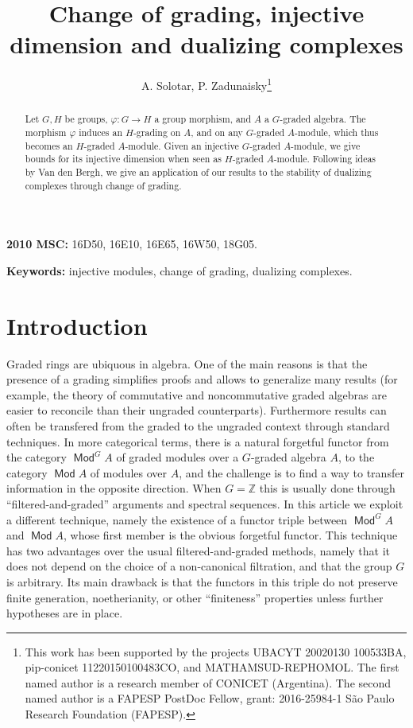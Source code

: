 \documentclass[11pt,fleqn]{article}
\title{
Change of grading, injective dimension and dualizing complexes
}
\author{A. Solotar,
P. Zadunaisky\footnote{This work has been supported by the projects 
UBACYT 20020130 100533BA, pip-conicet 11220150100483CO, and 
MATHAMSUD-REPHOMOL. The first named author is a research member of CONICET 
(Argentina). The second named author is a FAPESP PostDoc Fellow, grant: 
2016-25984-1 S\~ao Paulo Research Foundation (FAPESP).}
}
\date{}
\newcommand\ZZ{\mathbb Z}
\renewcommand\to{\longrightarrow}
\renewcommand\phi{\varphi}
\DeclareMathOperator\Mod{\mathsf{Mod}}
\begin{document}
\maketitle
  
\begin{abstract}
Let $G,H$ be groups, $\phi: G \to H$ a group morphism, and $A$ a $G$-graded 
algebra. The morphism $\phi$ induces an $H$-grading on $A$, and on any 
$G$-graded $A$-module, which thus becomes an $H$-graded $A$-module.
Given an injective $G$-graded $A$-module, we give bounds for its injective
dimension when seen as $H$-graded $A$-module. Following ideas by Van den
Bergh, we give an application of our results to the stability of dualizing
complexes through change of grading.
\end{abstract}

\textbf{2010 MSC:} 16D50, 16E10, 16E65, 16W50, 18G05.

\textbf{Keywords:} injective modules, change of grading, dualizing complexes.

\section{Introduction}
Graded rings are ubiquous in algebra. One of the main reasons is that the
presence of a grading simplifies proofs and allows to generalize many results
(for example, the theory of commutative and noncommutative graded algebras are 
easier to reconcile than their ungraded counterparts). Furthermore results can 
often be transfered from the graded to the ungraded context through standard 
techniques. In more categorical terms, there is a natural forgetful functor 
from the category $\Mod^G A$ of graded modules over a $G$-graded algebra 
$A$, to the category $\Mod A$ of modules over $A$, and the challenge is to 
find a way to transfer information in the opposite direction. When $G = \ZZ$ 
this is usually done through ``filtered-and-graded'' arguments and spectral 
sequences. In this article we exploit a different technique, 
namely the existence of a functor triple between $\Mod^G A$ and $\Mod A$, 
whose first member is the obvious forgetful functor. This technique has two 
advantages over the usual filtered-and-graded methods, namely that it does not 
depend on the choice of a non-canonical filtration, and that the group $G$ is
arbitrary. Its main drawback is that the functors in this triple do not 
preserve finite generation, noetherianity, or other ``finiteness'' properties
unless further hypotheses are in place.
\end{document}
